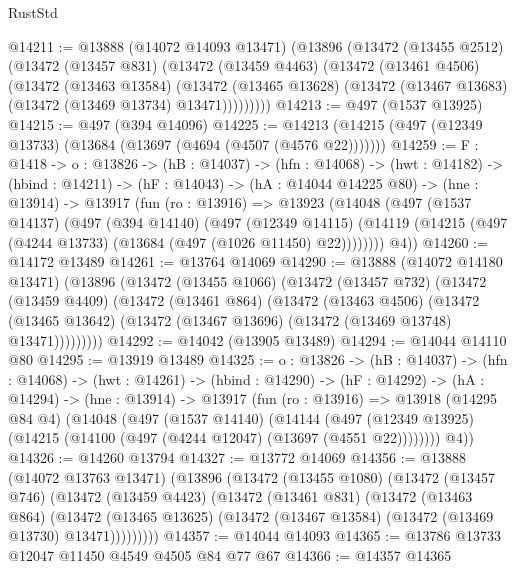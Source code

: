 \begin{lexlean}{RustStd}
\begin{coremodule}
@14211 := @13888
    (@14072 @14093 @13471)
    (@13896
      (@13472
        (@13455 @2512)
        (@13472
          (@13457 @831)
          (@13472
            (@13459 @4463)
            (@13472
              (@13461 @4506)
              (@13472
                (@13463 @13584)
                (@13472
                  (@13465 @13628)
                  (@13472 (@13467 @13683) (@13472 (@13469 @13734) @13471)))))))))
@14213 := @497 (@1537 @13925)
@14215 := @497 (@394 @14096)
@14225 := @14213 (@14215 (@497 (@12349 @13733) (@13684 (@13697 (@4694 (@4507 (@4576 @22)))))))
@14259 := {F : @1418} ->
  {o : @13826} ->
  (hB : @14037) ->
  (hfn : @14068) ->
  (hwt : @14182) ->
  (hbind : @14211) ->
  (hF : @14043) ->
  (hA : @14044 @14225 @80) ->
  (hne : @13914) ->
  @13917
    (fun (ro : @13916) =>
    @13923
      (@14048
        (@497
          (@1537 @14137)
          (@497
            (@394 @14140)
            (@497
              (@12349 @14115)
              (@14119 (@14215 (@497 (@4244 @13733) (@13684 (@497 (@1026 @11450) @22))))))))
        @4))
@14260 := @14172 @13489
@14261 := @13764 @14069
@14290 := @13888
    (@14072 @14180 @13471)
    (@13896
      (@13472
        (@13455 @1066)
        (@13472
          (@13457 @732)
          (@13472
            (@13459 @4409)
            (@13472
              (@13461 @864)
              (@13472
                (@13463 @4506)
                (@13472
                  (@13465 @13642)
                  (@13472 (@13467 @13696) (@13472 (@13469 @13748) @13471)))))))))
@14292 := @14042 (@13905 @13489)
@14294 := @14044 @14110 @80
@14295 := @13919 @13489
@14325 := {o : @13826} ->
  (hB : @14037) ->
  (hfn : @14068) ->
  (hwt : @14261) ->
  (hbind : @14290) ->
  (hF : @14292) ->
  (hA : @14294) ->
  (hne : @13914) ->
  @13917
    (fun (ro : @13916) =>
    @13918
      (@14295 @84 @4)
      (@14048
        (@497
          (@1537 @14140)
          (@14144
            (@497 (@12349 @13925) (@14215 (@14100 (@497 (@4244 @12047) (@13697 (@4551 @22))))))))
        @4))
@14326 := @14260 @13794
@14327 := @13772 @14069
@14356 := @13888
    (@14072 @13763 @13471)
    (@13896
      (@13472
        (@13455 @1080)
        (@13472
          (@13457 @746)
          (@13472
            (@13459 @4423)
            (@13472
              (@13461 @831)
              (@13472
                (@13463 @864)
                (@13472
                  (@13465 @13625)
                  (@13472 (@13467 @13584) (@13472 (@13469 @13730) @13471)))))))))
@14357 := @14044 @14093
@14365 := @13786 @13733 @12047 @11450 @4549 @4505 @84 @77 @67
@14366 := @14357 @14365

\end{coremodule}
\end{lexlean}
